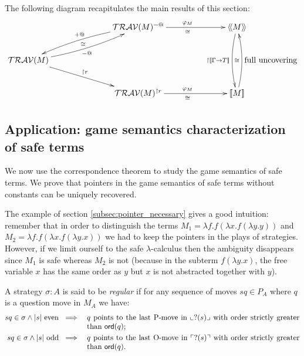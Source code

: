The following diagram recapitulates the main results of this section:
$$
\xymatrix @C=6pc{
                                           & \travset(M)^{-@} \ar@/_/[dl]_{+@}  \ar[r]^{\varphi_M}_\cong & \intersem{M} \ar@/_/[dd]_{\upharpoonright \sem{\Gamma\rightarrow T}} \\
\travset(M) \ar@/_/[ur]_{-@}^{\cong} \ar[dr]^{\upharpoonright r}  \\
                                           & \travset(M)^{\upharpoonright r} \ar[r]^{\varphi_M}_\cong & \sem{M} \ar@/_/[uu]^{\cong}_{\mbox{full uncovering}}
}
$$



\subsection{Application: game semantics characterization of safe terms}
We now use the correspondence theorem to study the game semantics of
safe terms. We prove that pointers in the game semantics of
safe terms without constants can be uniquely recovered.

The example of section \ref{subsec:pointer_necessary} gives a good
intuition: remember that in order to distinguish the terms
$M_1 = \lambda f . f (\lambda x . f (\lambda y .y ))$ and
$M_2 = \lambda f . f (\lambda x . f (\lambda y .x ))$ we had to keep the pointers in the plays of strategies.
However, if we limit ourself to the safe $\lambda$-calculus then the
ambiguity disappears since $M_1$ is safe whereas $M_2$ is not (because
in the subterm $f (\lambda y . x)$, the free variable $x$ has the same
order as $y$ but $x$ is not abstracted together with $y$).

\begin{dfn}
A strategy $\sigma : A$ is said to be \emph{regular} if for any sequence of moves $s q \in P_A$
where $q$ is a question move in $M_A$ we have:
\begin{eqnarray*}
s q \in \sigma \wedge |s| \mbox{ even } &\implies& \parbox[t]{10cm}{$q$ points to the last P-move in $\oview{?(s)}$ with order strictly greater than $\ord{q}$;} \\
s q \in \sigma \wedge |s| \mbox{ odd } &\implies& \parbox[t]{10cm}{$q$  points to the last O-move in $\pview{?(s)}$ with order strictly greater than $\ord{q}$.}
\end{eqnarray*}
\end{dfn}

